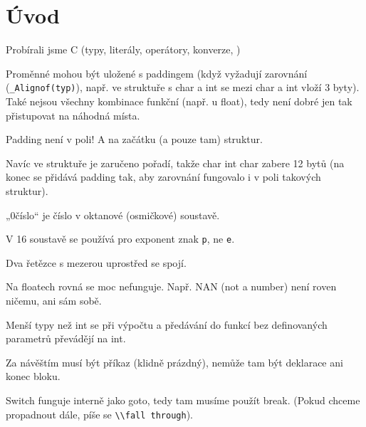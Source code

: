 \documentclass[12pt]{article}                   %
\begin{document}
\section{Úvod}
    \begin{poznamka}
        Probírali jsme C (typy, literály, operátory, konverze, )
    \end{poznamka}

    \begin{upozorneni}
        Proměnné mohou být uložené s paddingem (když vyžadují zarovnání (\verb|_Alignof(typ)|), např. ve struktuře s char a int se mezi char a int vloží 3 byty). Také nejsou všechny kombinace funkční (např. u float), tedy není dobré jen tak přistupovat na náhodná místa.

        Padding není v poli! A na začátku (a pouze tam) struktur.

        Navíc ve struktuře je zaručeno pořadí, takže char int char zabere 12 bytů (na konec se přidává padding tak, aby zarovnání fungovalo i v poli takových struktur).
    \end{upozorneni}

    \begin{upozorneni}
        „0číslo“ je číslo v oktanové (osmičkové) soustavě.

        V 16 soustavě se používá pro exponent znak \verb|p|, ne \verb|e|.

        Dva řetězce s mezerou uprostřed se spojí.
    \end{upozorneni}

    \begin{upozorneni}
        Na floatech rovná se moc nefunguje. Např. NAN (not a number) není roven ničemu, ani sám sobě.
    \end{upozorneni}

    \begin{upozorneni}
        Menší typy než int se při výpočtu a předávání do funkcí bez definovaných parametrů převádějí na int.
    \end{upozorneni}


    \begin{upozorneni}
        Za návěštím musí být příkaz (klidně prázdný), nemůže tam být deklarace ani konec bloku.
    \end{upozorneni}

    \begin{upozorneni}
        Switch funguje interně jako goto, tedy tam musíme použít break. (Pokud chceme propadnout dále, píše se \verb|\\fall through|).
    \end{upozorneni}
\end{document}
